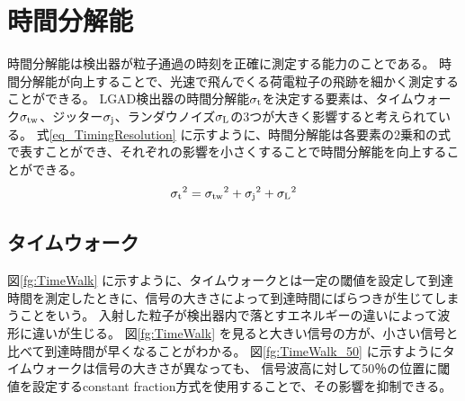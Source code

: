 \section{時間分解能}
時間分解能は検出器が粒子通過の時刻を正確に測定する能力のことである。%
時間分解能が向上することで、光速で飛んでくる荷電粒子の飛跡を細かく測定することができる。
LGAD検出器の時間分解能$\sigma_{\rm{t}}$を決定する要素は、タイムウォーク$\sigma_{\rm{tw}}$、ジッター$\sigma_{\rm{j}}$、ランダウノイズ$\sigma_{\rm{L}}$の3つが大きく影響すると考えられている。
式\ref{eq_TimingResolution} に示すように、時間分解能は各要素の2乗和の式で表すことができ、それぞれの影響を小さくすることで時間分解能を向上することができる。
\begin{equation}
    {\sigma_{\rm{t}}}^2 = {\sigma_{\rm{tw}}}^2 + {\sigma_{\rm{j}}}^2 + {\sigma_{\rm{L}}}^2
    \label{eq_TimingResolution}
\end{equation}

\subsection{タイムウォーク}
図\ref{fg:TimeWalk} に示すように、タイムウォークとは一定の閾値を設定して到達時間を測定したときに、信号の大きさによって到達時間にばらつきが生じてしまうことをいう。
入射した粒子が検出器内で落とすエネルギーの違いによって波形に違いが生じる。
図\ref{fg:TimeWalk} を見ると大きい信号の方が、小さい信号と比べて到達時間が早くなることがわかる。
図\ref{fg:TimeWalk_50} に示すようにタイムウォークは信号の大きさが異なっても、
信号波高に対して50％の位置に閾値を設定するconstant fraction方式を使用することで、その影響を抑制できる。


